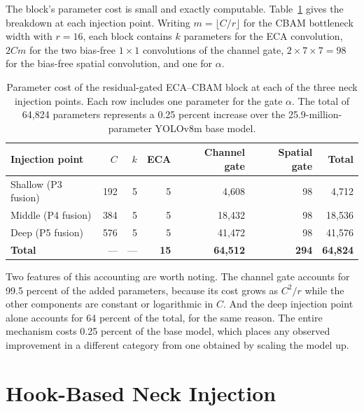 \documentclass[MScCS]{uccthesis}
\begin{document}
The block's parameter cost is small and exactly computable.
Table~\ref{tab:params} gives the breakdown at each injection point. Writing
$m = \lfloor C/r \rfloor$ for the CBAM bottleneck width with $r = 16$, each
block contains $k$ parameters for the ECA convolution, $2Cm$ for the two
bias-free $1\times1$ convolutions of the channel gate, $2 \times 7 \times 7 = 98$
for the bias-free spatial convolution, and one for $\alpha$.

\begin{table}[tbp]
\centering
\small
\setlength{\tabcolsep}{4pt}
\begin{tabularx}{\textwidth}{@{}>{\RaggedRight\arraybackslash}X rrrrrr@{}}
\toprule
\textbf{Injection point} & \textbf{$C$} & \textbf{$k$} & \textbf{ECA} &
\textbf{Channel gate} & \textbf{Spatial gate} & \textbf{Total} \\
\midrule
Shallow (P3 fusion) & 192 & 5 & 5  & 4{,}608  & 98 & 4{,}712 \\
Middle (P4 fusion)  & 384 & 5 & 5  & 18{,}432 & 98 & 18{,}536 \\
Deep (P5 fusion)    & 576 & 5 & 5  & 41{,}472 & 98 & 41{,}576 \\
\midrule
\textbf{Total}      & --- & --- & \textbf{15} & \textbf{64{,}512} &
   \textbf{294} & \textbf{64{,}824} \\
\bottomrule
\end{tabularx}
\caption[Parameter cost of the residual-gated block.]
        {\label{tab:params}Parameter cost of the residual-gated ECA--CBAM block
         at each of the three neck injection points. Each row includes one
         parameter for the gate $\alpha$. The total of 64,824 parameters
         represents a 0.25 percent increase over the 25.9-million-parameter
         YOLOv8m base model.}
\end{table}

Two features of this accounting are worth noting. The channel gate accounts for
99.5 percent of the added parameters, because its cost grows as $C^{2}/r$ while
the other components are constant or logarithmic in $C$. And the deep injection
point alone accounts for 64 percent of the total, for the same reason. The
entire mechanism costs 0.25 percent of the base model, which places any
observed improvement in a different category from one obtained by scaling the
model up.

\section{Hook-Based Neck Injection}
\label{sec:injection}
\end{document}
